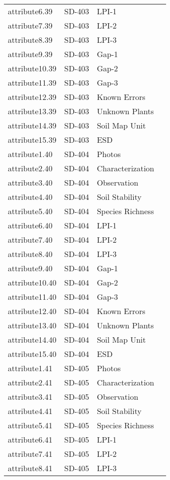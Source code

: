 \documentclass[
]{article}
\begin{document}
\begin{longtable}[]{@{}llll@{}}
attribute6.39 & SD-403 & LPI-1 & \\
attribute7.39 & SD-403 & LPI-2 & \\
attribute8.39 & SD-403 & LPI-3 & \\
attribute9.39 & SD-403 & Gap-1 & \\
attribute10.39 & SD-403 & Gap-2 & \\
attribute11.39 & SD-403 & Gap-3 & \\
attribute12.39 & SD-403 & Known Errors & \\
attribute13.39 & SD-403 & Unknown Plants & \\
attribute14.39 & SD-403 & Soil Map Unit & \\
attribute15.39 & SD-403 & ESD & \\
attribute1.40 & SD-404 & Photos & \\
attribute2.40 & SD-404 & Characterization & \\
attribute3.40 & SD-404 & Observation & \\
attribute4.40 & SD-404 & Soil Stability & \\
attribute5.40 & SD-404 & Species Richness & \\
attribute6.40 & SD-404 & LPI-1 & \\
attribute7.40 & SD-404 & LPI-2 & \\
attribute8.40 & SD-404 & LPI-3 & \\
attribute9.40 & SD-404 & Gap-1 & \\
attribute10.40 & SD-404 & Gap-2 & \\
attribute11.40 & SD-404 & Gap-3 & \\
attribute12.40 & SD-404 & Known Errors & \\
attribute13.40 & SD-404 & Unknown Plants & \\
attribute14.40 & SD-404 & Soil Map Unit & \\
attribute15.40 & SD-404 & ESD & \\
attribute1.41 & SD-405 & Photos & \\
attribute2.41 & SD-405 & Characterization & \\
attribute3.41 & SD-405 & Observation & \\
attribute4.41 & SD-405 & Soil Stability & \\
attribute5.41 & SD-405 & Species Richness & \\
attribute6.41 & SD-405 & LPI-1 & \\
attribute7.41 & SD-405 & LPI-2 & \\
attribute8.41 & SD-405 & LPI-3 & \\

\end{longtable}
\end{document}
